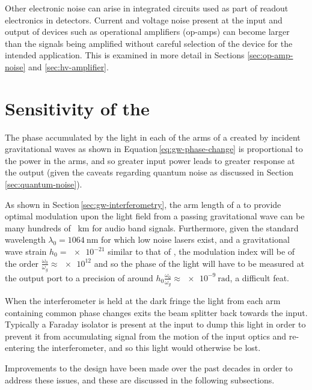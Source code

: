 Other electronic noise can arise in integrated circuits used as part of readout electronics in detectors. Current and voltage noise present at the input and output of devices such as operational amplifiers (op-amps) can become larger than the signals being amplified without careful selection of the device for the intended application. This is examined in more detail in Sections \ref{sec:op-amp-noise} and \ref{sec:hv-amplifier}.

\section{\label{sec:ifo-response}Sensitivity of the \MI{}}
The phase accumulated by the light in each of the arms of a \MI{} created by incident gravitational waves as shown in Equation\,\ref{eq:gw-phase-change} is proportional to the power in the arms, and so greater input power leads to greater response at the output (given the caveats regarding quantum noise as discussed in Section\,\ref{sec:quantum-noise}).

As shown in Section\,\ref{sec:gw-interferometry}, the arm length of a \MI{} to provide optimal modulation upon the light field from a passing gravitational wave can be many hundreds of \SI{}{\kilo\meter} for audio band signals. Furthermore, given the standard wavelength $\lambda_0 = \SI{1064}{\nano\meter}$ for which low noise lasers exist, and a gravitational wave strain $h_0 = \num{e-21}$ similar to that of \GWFIRSTEVENT{}, the modulation index will be of the order $\frac{\omega_0}{\omega_g} \approx \num{e12}$ and so the phase of the light will have to be measured at the output port to a precision of around $h_0 \frac{\omega_0}{\omega_g} \approx \SI{e-9}{\radian}$, a difficult feat.

When the interferometer is held at the dark fringe the light from each arm containing common phase changes exits the beam splitter back towards the input. Typically a Faraday isolator is present at the input to dump this light in order to prevent it from accumulating signal from the motion of the input optics and re-entering the interferometer, and so this light would otherwise be lost.

Improvements to the \MI{} design have been made over the past decades in order to address these issues, and these are discussed in the following subsections.

